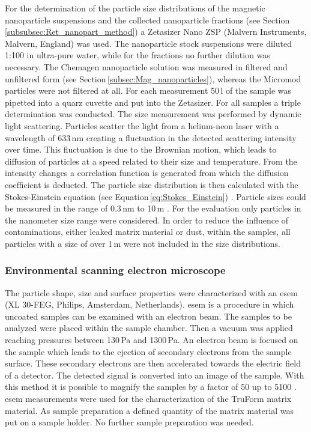For the determination of the particle size distributions of the magnetic nanoparticle suspensions and the collected nanoparticle fractions (see Section\,\ref{subsubsec:Ret_nanopart_method}) a Zetasizer Nano ZSP (Malvern Instruments, Malvern, England) was used. The nanoparticle stock suspensions were diluted 1:100 in ultra-pure water, while for the fractions no further dilution was necessary. The Chemagen nanoparticle solution was measured in filtered and unfiltered form (see Section\,\ref{subsec:Mag_nanoparticles}), whereas the Micromod particles were not filtered at all. For each measurement 50\,\textmu l of the sample was pipetted into a quarz cuvette and put into the Zetasizer. For all samples a triple determination was conducted. The size measurement was performed by dynamic light scattering. Particles scatter the light from a helium-neon laser with a wavelength of 633\,nm creating a fluctuation in the detected scattering intensity over time. This fluctuation is due to the Brownian motion, which leads to diffusion of particles at a speed related to their size and temperature. From the intensity changes a correlation function is generated from which the diffusion coefficient is deducted. The particle size distribution is then calculated with the Stokes-Einstein equation (see Equation\,\ref{eq:Stokes_Einstein}) \cite{berne2000dynamic}. Particle sizes could be measured in the range of 0.3\,nm to 10\,\textmu m \cite{Zetasizer}. For the evaluation only particles in the nanometer size range were considered. In order to reduce the influence of contaminations, either leaked matrix material or dust, within the samples, all particles with a size of over 1\,\textmu m were not included in the size distributions.

\subsubsection{Environmental scanning electron microscope}
\label{subsubsec:ESEM}
The particle shape, size and surface properties were characterized with an \gls{esem} (XL 30-FEG, Philips, Amsterdam, Netherlands). \gls{esem} is a procedure in which uncoated samples can be examined with an electron beam. The samples to be analyzed were placed within the sample chamber. Then a vacuum was applied reaching pressures between 130\,Pa and 1300\,Pa. An electron beam is focused on the sample which leads to the ejection of secondary electrons from the sample surface. These secondary electrons are then accelerated towards the electric field of a detector. The detected signal is converted into an image of the sample. With this method it is possible to magnify the samples by a factor of 50 up to 5100 \cite{danilatos1993introduction}.     
\gls{esem} measurements were used for the characterization of the TruForm matrix material. As sample preparation a defined quantity of the matrix material was put on a sample holder. No further sample preparation was needed.

